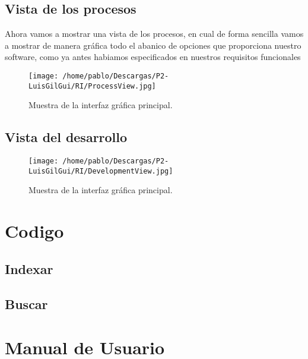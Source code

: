 \subsection{Vista de los procesos}

Ahora vamos a mostrar una vista de los procesos, en cual de forma sencilla vamos a mostrar de manera gráfica todo el abanico de opciones que proporciona nuestro software, como ya antes habiamos especificados en nuestros requisitos funcionales

\begin{figure}[H] %
\centering
\texttt{[image: /home/pablo/Descargas/P2-LuisGilGui/RI/ProcessView.jpg]}  %
\caption{Muestra de la interfaz gráfica principal.}\label{figura1}
\end{figure}
\subsection{Vista del desarrollo}
\begin{figure}[H] %
\centering
\texttt{[image: /home/pablo/Descargas/P2-LuisGilGui/RI/DevelopmentView.jpg]}  %
\caption{Muestra de la interfaz gráfica principal.}\label{figura1}
\end{figure}

\section{Codigo}
\subsection{Indexar}
\lstset{breaklines=true}

\subsection{Buscar}

\section{Manual de Usuario}








